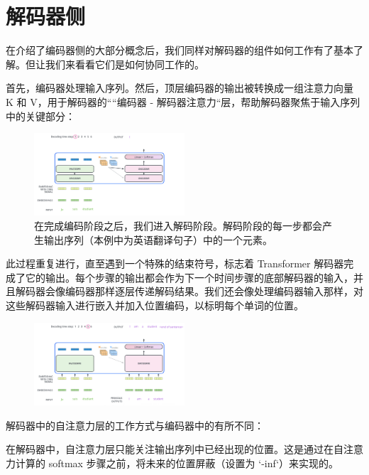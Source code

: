 \documentclass[cn,hazy,blue,10pt,normal]{elegantnote}
\begin{document}
\newpage

\section{解码器侧}

在介绍了编码器侧的大部分概念后，我们同样对解码器的组件如何工作有了基本了解。但让我们来看看它们是如何协同工作的。

首先，编码器处理输入序列。然后，顶层编码器的输出被转换成一组注意力向量 K 和 V，用于解码器的““编码器 - 解码器注意力“层，帮助解码器聚焦于输入序列中的关键部分：

\begin{figure}[ht]
	\centering
	\includegraphics[width=0.5\textwidth]{image/transformer_decoding_1.png}
	\caption{在完成编码阶段之后，我们进入解码阶段。解码阶段的每一步都会产生输出序列（本例中为英语翻译句子）中的一个元素。
	}
\end{figure}

此过程重复进行，直至遇到一个特殊的结束符号，标志着 Transformer 解码器完成了它的输出。每个步骤的输出都会作为下一个时间步骤的底部解码器的输入，并且解码器会像编码器那样逐层传递解码结果。我们还会像处理编码器输入那样，对这些解码器输入进行嵌入并加入位置编码，以标明每个单词的位置。

\begin{figure}[ht]
	\centering
	\includegraphics[width=0.5\textwidth]{image/transformer_decoding_2.png}
\end{figure}

解码器中的自注意力层的工作方式与编码器中的有所不同：

在解码器中，自注意力层只能关注输出序列中已经出现的位置。这是通过在自注意力计算的 softmax 步骤之前，将未来的位置屏蔽（设置为 `-inf`）来实现的。
\end{document}
